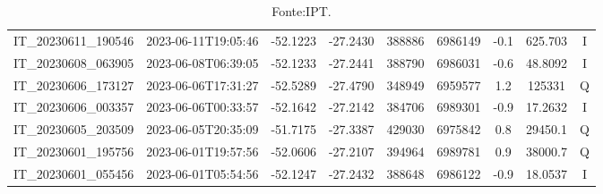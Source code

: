 \begin{table}[htb!]
\begin{center}
{\begin{tabular}{ccccS[table-format=6.0]S[table-format=7.0]ccc}
                IT\_20230611\_190546 & 2023-06-11T19:05:46 & -52.1223 & -27.2430 & 388886 & 6986149 & -0.1 & \num[round-precision=3,round-mode=figures,scientific-notation=true]{625.703} & I \\
                IT\_20230608\_063905 & 2023-06-08T06:39:05 & -52.1233 & -27.2441 & 388790 & 6986031 & -0.6 & \num[round-precision=3,round-mode=figures,scientific-notation=true]{48.8092} & I \\
                IT\_20230606\_173127 & 2023-06-06T17:31:27 & -52.5289 & -27.4790 & 348949 & 6959577 & 1.2 & \num[round-precision=3,round-mode=figures,scientific-notation=true]{125331} & Q \\
                IT\_20230606\_003357 & 2023-06-06T00:33:57 & -52.1642 & -27.2142 & 384706 & 6989301 & -0.9 & \num[round-precision=3,round-mode=figures,scientific-notation=true]{17.2632} & I \\
                IT\_20230605\_203509 & 2023-06-05T20:35:09 & -51.7175 & -27.3387 & 429030 & 6975842 & 0.8 & \num[round-precision=3,round-mode=figures,scientific-notation=true]{29450.1} & Q \\
                IT\_20230601\_195756 & 2023-06-01T19:57:56 & -52.0606 & -27.2107 & 394964 & 6989781 & 0.9 & \num[round-precision=3,round-mode=figures,scientific-notation=true]{38000.7} & Q \\
                IT\_20230601\_055456 & 2023-06-01T05:54:56 & -52.1247 & -27.2432 & 388648 & 6986122 & -0.9 & \num[round-precision=3,round-mode=figures,scientific-notation=true]{18.0537} & I \\
                \bottomrule
            \end{tabular}
        }
        \label{tab:dados_terremoto}
        \caption*{Fonte:IPT.}
    \end{center}
\end{table}
